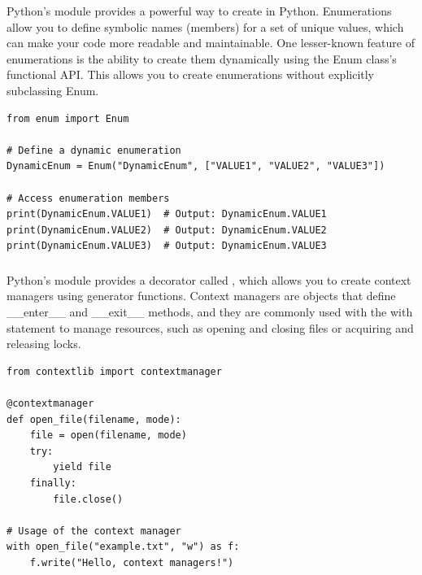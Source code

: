 Python's  module provides a powerful way to create  in Python. Enumerations allow you to define symbolic names (members) for a set of unique values, which can make your code more readable and maintainable. One lesser-known feature of enumerations is the ability to create them dynamically using the Enum class's functional API. This allows you to create enumerations without explicitly subclassing Enum.
\begin{lstlisting}
from enum import Enum

# Define a dynamic enumeration
DynamicEnum = Enum("DynamicEnum", ["VALUE1", "VALUE2", "VALUE3"])

# Access enumeration members
print(DynamicEnum.VALUE1)  # Output: DynamicEnum.VALUE1
print(DynamicEnum.VALUE2)  # Output: DynamicEnum.VALUE2
print(DynamicEnum.VALUE3)  # Output: DynamicEnum.VALUE3
\end{lstlisting}










\subsubsection{}

Python's  module provides a decorator called , which allows you to create context managers using generator functions. Context managers are objects that define \_\_enter\_\_ and \_\_exit\_\_ methods, and they are commonly used with the with statement to manage resources, such as opening and closing files or acquiring and releasing locks.
\begin{lstlisting}
from contextlib import contextmanager

@contextmanager
def open_file(filename, mode):
    file = open(filename, mode)
    try:
        yield file
    finally:
        file.close()

# Usage of the context manager
with open_file("example.txt", "w") as f:
    f.write("Hello, context managers!")
\end{lstlisting}

